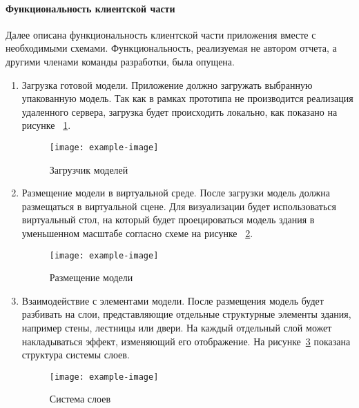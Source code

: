 \paragraph{Функциональность клиентской части}

Далее описана функциональность клиентской части приложения
вместе с необходимыми схемами.
Функциональность, реализуемая не автором отчета,
а другими членами команды разработки, была опущена.

\begin{enumerate}
    \item {
        Загрузка готовой модели.
        Приложение должно загружать выбранную упакованную модель.
        Так как в рамках прототипа не производится реализация удаленного сервера,
        загрузка будет происходить локально, как показано на рисунке~%
        \ref{figure:CModelLoader}.

        \begin{figure}[ht]
            \centering
            \texttt{[image: example-image]}
            \caption{Загрузчик моделей}
            \label{figure:CModelLoader}
        \end{figure}

    } 
    \item {
        Размещение модели в виртуальной среде.
        После загрузки модель должна размещаться в виртуальной сцене.
        Для визуализации будет использоваться виртуальный стол,
        на который будет проецироваться модель здания
        в уменьшенном масштабе согласно схеме на рисунке~%
        \ref{figure:CStand}.

        \begin{figure}[ht]
            \centering
            \texttt{[image: example-image]}
            \caption{Размещение модели}
            \label{figure:CStand}
        \end{figure}

    } 
    \item {
        Взаимодействие с элементами модели.
        После размещения модель будет разбивать на слои,
        представляющие отдельные структурные элементы здания,
        например стены, лестницы или двери.
        На каждый отдельный слой может накладываться эффект,
        изменяющий его отображение.
        На рисунке~\ref{figure:CLayers} показана
        структура системы слоев.

        \begin{figure}[ht]
            \centering
            \texttt{[image: example-image]}
            \caption{Система слоев}
            \label{figure:CLayers}
        \end{figure}

    } 
\end{enumerate}

